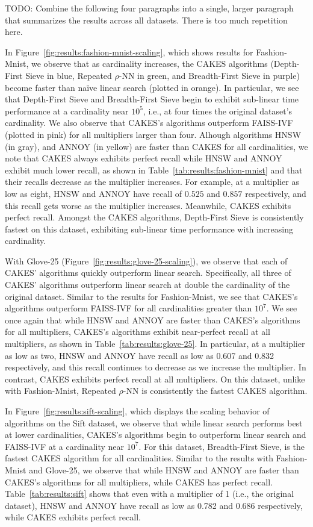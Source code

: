 {\color{red} TODO: Combine the following four paragraphs into a single, larger paragraph that summarizes the results across all datasets. There is too much repetition here.}

In Figure~\ref{fig:results:fashion-mnist-scaling}, which shows results for Fashion-Mnist, we observe that as cardinality increases, the CAKES algorithms (Depth-First Sieve in blue, Repeated $\rho$-NN in green, and Breadth-First Sieve in purple) become faster than na\"{i}ve linear search (plotted in orange).
In particular, we see that Depth-First Sieve and Breadth-First Sieve begin to exhibit sub-linear time performance at a cardinality near $10^5$, i.e., at four times the original dataset's cardinality.
We also observe that CAKES's algorithms outperform FAISS-IVF (plotted in pink) for all multipliers larger than four.
Alhough algorithms HNSW (in gray), and ANNOY (in yellow) are faster than CAKES for all cardinalities, we note that CAKES always exhibits perfect recall while HNSW and ANNOY exhibit much lower recall, as shown in Table~\ref{tab:results:fashion-mnist} and that their recalls decrease as the multiplier increases.
For example, at a multiplier as low as eight, HNSW and ANNOY have recall of $0.525$ and $0.857$ respectively,
and this recall gets worse as the multiplier increases.
Meanwhile, CAKES exhibits perfect recall.
Amongst the CAKES algorithms, Depth-First Sieve is consistently fastest on this dataset, exhibiting sub-linear time performance with increasing cardinality.

With Glove-25 (Figure~\ref{fig:results:glove-25-scaling}), we observe that each of CAKES' algorithms quickly outperform linear search.
Specifically, all three of CAKES' algorithms outperform linear search at double the cardinality of the original dataset.
Similar to the results for Fashion-Mnist, we see that CAKES's algorithms outperform FAISS-IVF for all cardinalities greater than $10^7$.
We see once again that while HNSW and ANNOY are faster than CAKES's algorithms for all multipliers, CAKES's algorithms exhibit near-perfect recall at all multipliers, as shown in Table~\ref{tab:results:glove-25}.
In particular, at a multiplier as low as two, HNSW and ANNOY have recall as low as 0.607 and 0.832 respectively, and this recall continues to decrease as we increase the multiplier.
In contrast, CAKES exhibits perfect recall at all multipliers.
On this dataset, unlike with Fashion-Mnist, Repeated $\rho$-NN is consistently the fastest CAKES algorithm.

In Figure~\ref{fig:results:sift-scaling}, which displays the scaling behavior of algorithms on the Sift dataset, we observe that while linear search performs best at lower cardinalities, CAKES's algorithms begin to outperform linear search and FAISS-IVF at a cardinality near $10^7$.
For this dataset, Breadth-First Sieve, is the fastest CAKES algorithm for all cardinalities.
Similar to the results with Fashion-Mnist and Glove-25, we observe that while HNSW and ANNOY are faster than CAKES's algorithms for all multipliers, while CAKES has perfect recall.
Table~\ref{tab:results:sift} shows that even with a multiplier of 1 (i.e., the original dataset), HNSW and ANNOY have recall as low as 0.782 and 0.686 respectively, while CAKES exhibits perfect recall.

